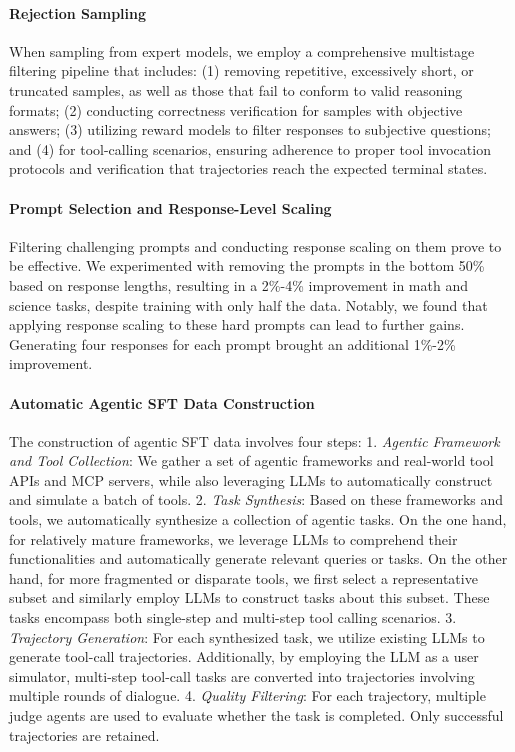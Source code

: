 \paragraph{Rejection Sampling} When sampling from expert models, we employ a comprehensive multistage filtering pipeline that includes: (1) removing repetitive, excessively short, or truncated samples, as well as those that fail to conform to valid reasoning formats; (2) conducting correctness verification for samples with objective answers; (3) utilizing reward models to filter responses to subjective questions; and (4) for tool-calling scenarios, ensuring adherence to proper tool invocation protocols and verification that trajectories reach the expected terminal states.

\paragraph{Prompt Selection and Response-Level Scaling} Filtering challenging prompts and conducting response scaling on them prove to be effective. We experimented with removing the prompts in the bottom 50\% based on response lengths, resulting in a 2\%-4\% improvement in math and science tasks, despite training with only half the data. Notably, we found that applying response scaling to these hard prompts can lead to further gains. Generating four responses for each prompt brought an additional 1\%-2\% improvement.

\paragraph{Automatic Agentic SFT Data Construction} The construction of agentic SFT data involves four steps: 1. \emph{Agentic Framework and Tool Collection}: We gather a set of agentic frameworks and real-world tool APIs and MCP servers, while also leveraging LLMs to automatically construct and simulate a batch of tools. 2. \emph{Task Synthesis}: Based on these frameworks and tools, we automatically synthesize a collection of agentic tasks. On the one hand, for relatively mature frameworks, we leverage LLMs to comprehend their functionalities and automatically generate relevant queries or tasks. On the other hand, for more fragmented or disparate tools, we first select a representative subset and similarly employ LLMs to construct tasks about this subset. These tasks encompass both single-step and multi-step tool calling scenarios. 3. \emph{Trajectory Generation}: For each synthesized task, we utilize existing LLMs to generate tool-call trajectories. Additionally, by employing the LLM as a user simulator, multi-step tool-call tasks are converted into trajectories involving multiple rounds of dialogue. 4. \emph{Quality Filtering}: For each trajectory, multiple judge agents are used to evaluate whether the task is completed. Only successful trajectories are retained.

